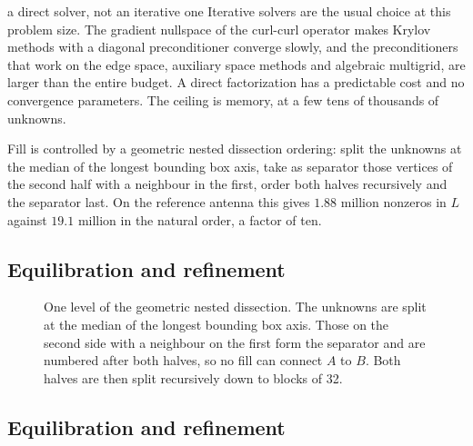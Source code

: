 \documentclass[11pt]{article}
\begin{document}
\begin{decision}{a direct solver, not an iterative one}
Iterative solvers are the usual choice at this problem size. The gradient
nullspace of the curl-curl operator makes Krylov methods with a diagonal
preconditioner converge slowly, and the preconditioners that work on the
edge space, auxiliary space methods and algebraic multigrid, are larger than
the entire budget. A direct factorization has a predictable cost and no
convergence parameters. The ceiling is memory, at a few tens of thousands of
unknowns.
\end{decision}

Fill is controlled by a geometric nested dissection ordering: split the
unknowns at the median of the longest bounding box axis, take as separator
those vertices of the second half with a neighbour in the first, order both
halves recursively and the separator last. On the reference antenna this
gives \(1.88\) million nonzeros in \(L\) against \(19.1\) million in the
natural order, a factor of ten.

\subsection{Equilibration and refinement}


\begin{figure}[H]
\centering
{}
\caption{One level of the geometric nested dissection. The unknowns are
split at the median of the longest bounding box axis. Those on the second
side with a neighbour on the first form the separator and are numbered
after both halves, so no fill can connect \(A\) to \(B\). Both halves are
then split recursively down to blocks of 32.}
\label{fig:nd}
\end{figure}

\subsection{Equilibration and refinement}
\end{document}
